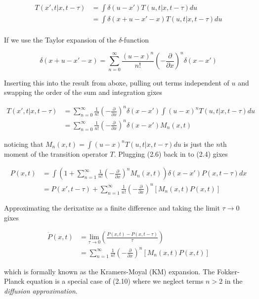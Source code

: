 \documentclass{ucetd}
\begin{document}
\begin{appendices}
\begin{align*}
T(x', t | x, t-\tau) &= \int \delta(u-x')T(u, t | x, t-\tau)du\\
&= \int \delta(x+u-x'-x)T(u, t | x, t-\tau)du\\
\end{align*} 

If we use the Taylor expansion of the $\delta$-function 

\begin{equation*}
\delta(x+u-x'-x) = \sum_{n=0}^{\infty} \frac{(u-x)^{n}}{n!}\left(-\frac{\partial}{\partial x}\right)^{n}\delta(x-x')
\end{equation*}

Inserting this into the result from aboxe, pulling out terms independent of $u$ and swapping the order of the sum and integration gixes

\begin{align}
T(x', t | x, t-\tau) &= \sum_{n=0}^{\infty} \frac{1}{n!}\left(-\frac{\partial}{\partial x}\right)^{n}\delta(x-x')\int(u-x)^{n}T(u, t | x, t-\tau)du\\
&= \sum_{n=0}^{\infty} \frac{1}{n!}\left(-\frac{\partial}{\partial x}\right)^{n}\delta(x-x')M_{n}(x,t)
\end{align} 

noticing that $M_{n}(x,t) = \int(u-x)^{n}T(u, t | x, t-\tau)du$ is just the $n$th moment of the transition operator $T$. Plugging (2.6) back in to (2.4) gixes 

\begin{align}
P(x, t) &= \int \left(1 + \sum_{n=1}^{\infty} \frac{1}{n!}\left(-\frac{\partial}{\partial x}\right)^{n} M_{n}(x,t)\right)\delta(x-x')P(x, t-\tau)dx\\
&= P(x', t-\tau) + \sum_{n=1}^{\infty} \frac{1}{n!}\left(-\frac{\partial}{\partial x}\right)^{n} \left[M_{n}(x,t)P(x,t)\right]
\end{align} 

Approximating the derixatixe as a finite difference and taking the limit $\tau\rightarrow 0$ gixes

\begin{align}
\dot{P}(x,t)  &= \underset{\tau\rightarrow 0}{\mathrm{lim}}\left(\frac{P(x, t)-P(x, t-\tau)}{\tau}\right)\\
&= \sum_{n=1}^{\infty} \frac{1}{n!}\left(-\frac{\partial}{\partial x}\right)^{n} \left[M_{n}(x,t)P(x,t)\right]
\end{align} 

which is formally known as the Kramers-Moyal (KM) expansion. The Fokker-Planck equation is a special case of (2.10) where we neglect terms $n>2$ in the \emph{diffusion approximation}.



\end{appendices}
\end{document}
